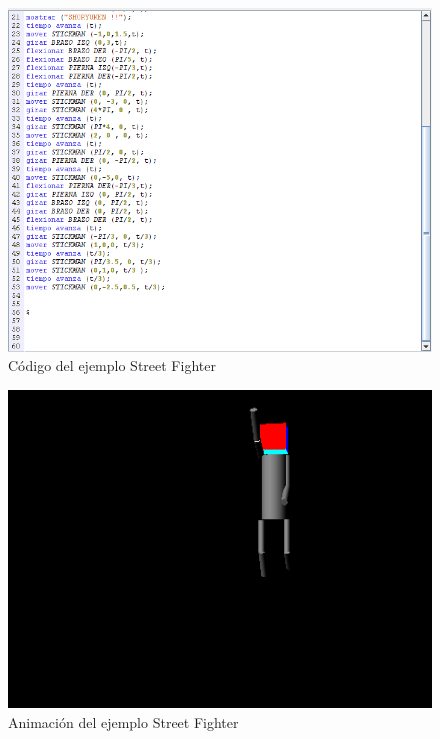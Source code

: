 \documentclass[a4paper, 12pt]{book}
\begin{document}
\begin{itemize}
\begin{figure}[htb]
\centerline{\includegraphics[width=\textwidth]{./imagenes/streetfighter-codigo.png}}
\caption{Código  del ejemplo Street Fighter}
\end{figure}


\begin{figure}[htb]
  \centerline{\includegraphics[width=\textwidth]{./imagenes/streetfighter-resultado1.png}}
  \caption{Animación del ejemplo Street Fighter}
\end{figure}


\end{itemize}
\end{document}
